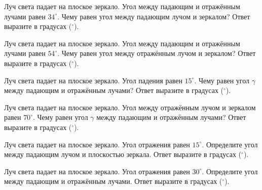 \begin{taskbasic}[code={\label{task:geom_opt_mirror_angle_34}}]
Луч света падает на плоское зеркало. Угол между падающим и отражённым лучами равен $34^\circ$. Чему равен угол между падающим лучом и зеркалом? Ответ выразите в градусах ($^\circ$).

\end{taskbasic}

\begin{taskbasic}[code={\label{task:geom_opt_mirror_angle_54}}]
Луч света падает на плоское зеркало. Угол между падающим и отражённым лучами равен $54^\circ$. Чему равен угол между отражённым лучом и зеркалом? Ответ выразите в градусах ($^\circ$).

\end{taskbasic}

\begin{taskbasic}[code={\label{task:geom_opt_mirror_angle_15_between}}]
Луч света падает на плоское зеркало. Угол падения равен $15^\circ$. Чему равен угол $\gamma$ между падающим и отражённым лучами? Ответ выразите в градусах ($^\circ$).

\end{taskbasic}

\begin{taskbasic}[code={\label{task:geom_opt_mirror_angle_70_between}}]
Луч света падает на плоское зеркало. Угол между отражённым лучом и зеркалом равен $70^\circ$. Чему равен угол $\gamma$ между падающим и отражённым лучами? Ответ выразите в градусах ($^\circ$).

\end{taskbasic}

\begin{taskbasic}[code={\label{task:geom_opt_mirror_refl_15_surface}}]
Луч света падает на плоское зеркало. Угол отражения равен $15^\circ$. Определите угол между падающим лучом и плоскостью зеркала. Ответ выразите в градусах ($^\circ$).

\end{taskbasic}

\begin{taskbasic}[code={\label{task:geom_opt_mirror_refl_30_between}}]
Луч света падает на плоское зеркало. Угол отражения равен $30^\circ$. Определите угол между падающим и отражённым лучами. Ответ выразите в градусах ($^\circ$).

\end{taskbasic}

